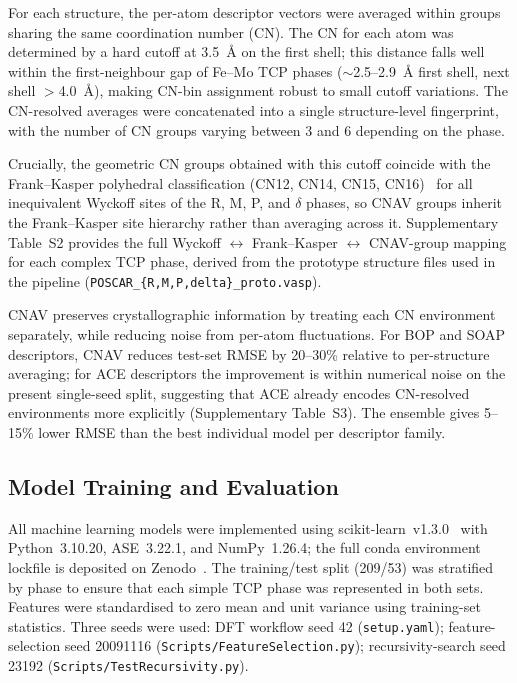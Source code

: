 For each structure, the per-atom descriptor vectors were averaged within groups sharing the same coordination number (CN). The CN for each atom was determined by a hard cutoff at \SI{3.5}{\angstrom} on the first shell; this distance falls well within the first-neighbour gap of Fe--Mo TCP phases ($\sim$2.5--2.9~\AA{} first shell, next shell $>$4.0~\AA), making CN-bin assignment robust to small cutoff variations. The CN-resolved averages were concatenated into a single structure-level fingerprint, with the number of CN groups varying between 3 and 6 depending on the phase.

Crucially, the geometric CN groups obtained with this cutoff coincide with the Frank--Kasper polyhedral classification (CN12, CN14, CN15, CN16)~\cite{frank_kasper_1,frank_kasper_2} for all inequivalent Wyckoff sites of the R, M, P, and $\delta$ phases, so CNAV groups inherit the Frank--Kasper site hierarchy rather than averaging across it. Supplementary Table~S2 provides the full Wyckoff $\leftrightarrow$ Frank--Kasper $\leftrightarrow$ CNAV-group mapping for each complex TCP phase, derived from the prototype structure files used in the pipeline (\texttt{POSCAR\_\{R,M,P,delta\}\_proto.vasp}).

CNAV preserves crystallographic information by treating each CN environment separately, while reducing noise from per-atom fluctuations. For BOP and SOAP descriptors, CNAV reduces test-set RMSE by 20--30\% relative to per-structure averaging; for ACE descriptors the improvement is within numerical noise on the present single-seed split, suggesting that ACE already encodes CN-resolved environments more explicitly (Supplementary Table~S3). The ensemble gives 5--15\% lower RMSE than the best individual model per descriptor family.

\subsection{Model Training and Evaluation}

All machine learning models were implemented using scikit-learn~v1.3.0~\cite{sklearn} with Python~3.10.20, ASE~3.22.1, and NumPy~1.26.4; the full conda environment lockfile is deposited on Zenodo~\cite{zenodo}. The training/test split (209/53) was stratified by phase to ensure that each simple TCP phase was represented in both sets. Features were standardised to zero mean and unit variance using training-set statistics. Three seeds were used: DFT workflow seed 42 (\texttt{setup.yaml}); feature-selection seed 20091116 (\texttt{Scripts/FeatureSelection.py}); recursivity-search seed 23192 (\texttt{Scripts/TestRecursivity.py}).

